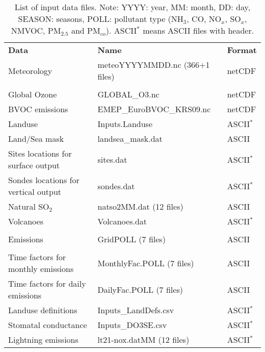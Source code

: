 \begin{table}
\caption[List of input data files]{List of input data files.
Note: YYYY: year, MM: month, DD: day, SEASON: seasons, POLL: pollutant
type (NH$_3$, CO, NO$_x$, SO$_x$, NMVOC,
PM$_{2.5}$ and PM$_{co}$). ASCII$^*$ means ASCII files with header.
\label{Tab:inputdata}}
\begin{small}
\hspace{-1cm}
\begin{tabular}{lll}
 && \\
\hline
{\bf Data} &  {\bf Name} & {\bf Format}\\
\hline\hline
\hline
Meteorology  &  meteoYYYYMMDD.nc \quad (366+1 files) & netCDF\\
& & \\
Global Ozone & GLOBAL\_O3.nc & netCDF\\
BVOC emissions & EMEP\_EuroBVOC\_KRS09.nc & netCDF\\
Landuse & Inputs.Landuse & ASCII$^*$\\
Land/Sea mask & landsea\_mask.dat & ASCII\\
Sites locations for surface output & sites.dat & ASCII$^*$\\
Sondes locations for vertical output & sondes.dat & ASCII$^*$\\
Natural SO$_2$ & natso2MM.dat  \quad (12 files) & ASCII\\
Volcanoes & Volcanoes.dat & ASCII$^*$\\
 && \\
Emissions & GridPOLL  \quad (7 files) & ASCII\\
 && \\
Time factors for monthly emissions& MonthlyFac.POLL  \quad (7 files) & ASCII\\
Time factors for daily emissions &  DailyFac.POLL  \quad (7 files)
& ASCII\\
Landuse definitions & Inputs\_LandDefs.csv & ASCII$^*$\\
Stomatal conductance & Inputs\_DO3SE.csv & ASCII$^*$\\
Lightning emissions & lt21-nox.datMM  \quad (12 files) & ASCII$^*$\\

\end{tabular}
\end{small}
\end{table}
